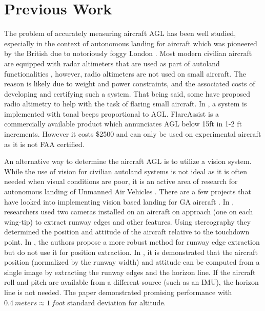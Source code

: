 \documentclass[letterpaper, conference]{IEEEtran}  %
\begin{document}
\section{Previous Work}
The problem of accurately measuring aircraft AGL has been well studied, especially in the context of autonomous landing for aircraft which was pioneered by the British due to notoriously foggy London \cite{Autolandwiki}. Most modern civilian aircraft are equipped with radar altimeters that are used as part of autoland functionalities \cite{RadioAltskybrary}, however, radio altimeters are not used on small aircraft. The reason is likely due to weight and power constraints, and the associated costs of developing and certifying such a system. That being said, some have proposed radio altimetry to help with the task of flaring small aircraft. In \cite{vidmar2006}, a system is implemented with tonal beeps proportional to AGL. FlareAssist\texttrademark \cite{FlareAssist} is a commercially available product which annunciates AGL below 15ft in 1-2 ft increments. However it costs \$2500 and can only be used on experimental aircraft as it is not FAA certified.

An alternative way to determine the aircraft AGL is to utilize a vision system. While the use of vision for civilian autoland systems is not ideal as it is often needed when visual conditions are poor, it is an active area of research for autonomous landing of Unmanned Air Vehicles \cite{Kong2014}. There are a few projects that have looked into implementing vision based landing for GA aircraft \cite{Liu2012}. In \cite{Trisiripisal2006}, researchers used two cameras installed on an aircraft on approach (one on each wing-tip) to extract runway edges and other features. Using stereography they determined the position and attitude of the aircraft relative to the touchdown point. In \cite{Naidu2011}, the authors propose a more robust method for runway edge extraction but do not use it for position extraction. In \cite{Sasa2000}, it is demonstrated that the aircraft position (normalized by the runway width) and attitude can be computed from a single image by extracting the runway edges and the horizon line. If the aircraft roll and pitch are available from a different source (such as an IMU), the horizon line is not needed. The paper demonstrated promising performance with $\SI{0.4}{meters} \approx \SI{1}{foot}$ standard deviation for altitude.
\end{document}
